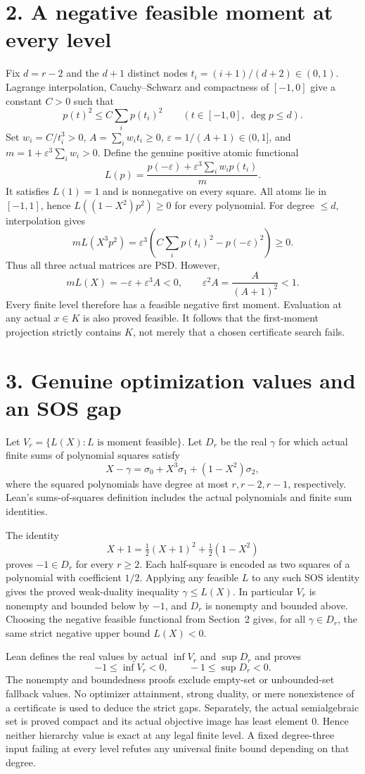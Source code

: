 \documentclass[10pt]{article}
\begin{document}
\section*{2. A negative feasible moment at every level}
Fix $d=r-2$ and the $d+1$ distinct nodes $t_i=(i+1)/(d+2)\in(0,1)$. Lagrange interpolation, Cauchy--Schwarz and compactness of $[-1,0]$ give a constant $C>0$ such that
\[
 p(t)^2\le C\sum_i p(t_i)^2\qquad
 (t\in[-1,0],\ \deg p\le d).
\]
Set $w_i=C/t_i^3>0$, $A=\sum_iw_it_i\ge0$, $\varepsilon=1/(A+1)\in(0,1]$, and $m=1+\varepsilon^3\sum_iw_i>0$. Define the genuine positive atomic functional
\[
 L(p)=\frac{p(-\varepsilon)+\varepsilon^3\sum_iw_ip(t_i)}{m}.
\]
It satisfies $L(1)=1$ and is nonnegative on every square. All atoms lie in $[-1,1]$, hence $L((1-X^2)p^2)\ge0$ for every polynomial. For degree $\le d$, interpolation gives
\[
 mL(X^3p^2)=\varepsilon^3\!\left(C\sum_i p(t_i)^2-p(-\varepsilon)^2\right)\ge0.
\]
Thus all three actual matrices are PSD. However,
\[
 mL(X)=-\varepsilon+\varepsilon^3 A<0,
 \qquad \varepsilon^2A=\frac{A}{(A+1)^2}<1.
\]
Every finite level therefore has a feasible negative first moment. Evaluation at any actual $x\in K$ is also proved feasible. It follows that the first-moment projection strictly contains $K$, not merely that a chosen certificate search fails.

\section*{3. Genuine optimization values and an SOS gap}
Let $V_r=\{L(X):L\text{ is moment feasible}\}$. Let $D_r$ be the real $\gamma$ for which actual finite sums of polynomial squares satisfy
\[
 X-\gamma=\sigma_0+X^3\sigma_1+(1-X^2)\sigma_2,
\]
where the squared polynomials have degree at most $r,r-2,r-1$, respectively. Lean's sums-of-squares definition includes the actual polynomials and finite sum identities.

The identity
\[
 X+1=\tfrac12(X+1)^2+\tfrac12(1-X^2)
\]
proves $-1\in D_r$ for every $r\ge2$. Each half-square is encoded as two squares of a polynomial with coefficient $1/2$. Applying any feasible $L$ to any such SOS identity gives the proved weak-duality inequality $\gamma\le L(X)$. In particular $V_r$ is nonempty and bounded below by $-1$, and $D_r$ is nonempty and bounded above. Choosing the negative feasible functional from Section~2 gives, for all $\gamma\in D_r$, the same strict negative upper bound $L(X)<0$.

Lean defines the real values by actual $\inf V_r$ and $\sup D_r$ and proves
\[
 -1\le\inf V_r<0,\qquad -1\le\sup D_r<0.
\]
The nonempty and boundedness proofs exclude empty-set or unbounded-set fallback values. No optimizer attainment, strong duality, or mere nonexistence of a certificate is used to deduce the strict gaps. Separately, the actual semialgebraic set is proved compact and its actual objective image has least element $0$. Hence neither hierarchy value is exact at any legal finite level. A fixed degree-three input failing at every level refutes any universal finite bound depending on that degree.
\end{document}
